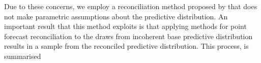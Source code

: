 \documentclass[graybox]{svmult}
\begin{document}


Due to these concerns, we employ a reconciliation method proposed by \cite{Gamakumara2018} that does not make parametric assumptions about the predictive distribution.  An important result that this method exploits is that applying methods for point forecast reconciliation to the draws from incoherent base predictive distribution results in a sample from the reconciled predictive distribution. This process, is summarised

\end{document}

